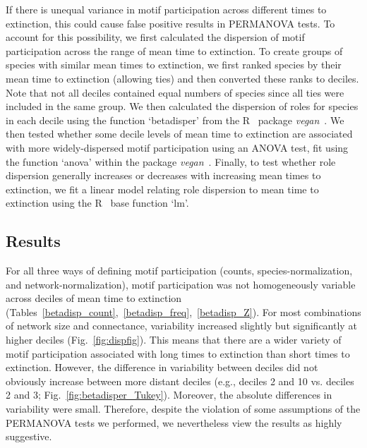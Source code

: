 \documentclass[12pt]{article}
\begin{document}
\begin{spacing}{2.0}
        If there is unequal variance in motif participation across different times to extinction, this could cause false positive results in PERMANOVA tests.
        To account for this possibility, we first calculated the dispersion of motif participation across the range of mean time to extinction.
        To create groups of species with similar mean times to extinction, we first ranked species by their mean time to extinction (allowing ties) and then converted these ranks to deciles. 
        Note that not all deciles contained equal numbers of species since all ties were included in the same group.
        We then calculated the dispersion of roles for species in each decile using the function `betadisper' from the R~\citep{R} package \emph{vegan}~\citep{vegan}.
        We then tested whether some decile levels of mean time to extinction are associated with more widely-dispersed motif participation using an ANOVA test, fit using the function `anova' within the package \emph{vegan}~\citep{vegan}.
        Finally, to test whether role dispersion generally increases or decreases with increasing mean times to extinction, we fit a linear model relating role dispersion to mean time to extinction using the R~\citep{R} base function `lm'.


	\subsection*{Results}

        For all three ways of defining motif participation (counts, species-normalization, and network-normalization), motif participation was not homogeneously variable across deciles of mean time to extinction (Tables~\ref{betadisp_count},~\ref{betadisp_freq},~\ref{betadisp_Z}). 
        For most combinations of network size and connectance, variability increased slightly but significantly at higher deciles (Fig.~\ref{fig:dispfig}).
        This means that there are a wider variety of motif participation associated with long times to extinction than short times to extinction.
        However, the difference in variability between deciles did not obviously increase between more distant deciles (e.g., deciles 2 and 10 vs. deciles 2 and 3; Fig.~\ref{fig:betadisper_Tukey}).
        Moreover, the absolute differences in variability were small.
        Therefore, despite the violation of some assumptions of the PERMANOVA tests we performed, we nevertheless view the results as highly suggestive.


\end{spacing}
\end{document}
